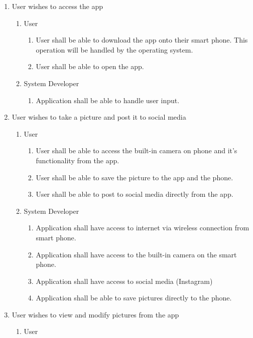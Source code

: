 \documentclass[]{article}
\begin{document}
\begin{enumerate}[{BE}1.]
	\item User wishes to access the app
	\begin{enumerate}[{VP1}.1]
		\item User
			\begin{enumerate}
				\item User shall be able to download the app onto their smart phone.  This operation will be handled by the operating system.
				\item User shall be able to open the app.
			\end{enumerate}
		\item System Developer
			\begin{enumerate}
				\item Application shall be able to handle user input.
			\end{enumerate}
	\end{enumerate}
	\item User wishes to take a picture and post it to social media
	\begin{enumerate}[{VP2}.1]
		\item User
			\begin{enumerate}
				\item User shall be able to access the built-in camera on phone and it's functionality from the app.
				\item User shall be able to save the picture to the app and the phone.
				\item User shall be able to post to social media directly from the app.
			\end{enumerate}
		\item System Developer
			\begin{enumerate}
				\item Application shall have access to internet via wireless connection from smart phone.
				\item Application shall have access to the built-in camera on the smart phone.
				\item Application shall have access to social media (Instagram)
				\item Application shall be able to save pictures directly to the phone.
			\end{enumerate}
	\end{enumerate}
	\item User wishes to view and modify pictures from the app
	\begin{enumerate} [{VP3}.1]
		\item User

\end{enumerate}
\end{enumerate}
\end{document}
